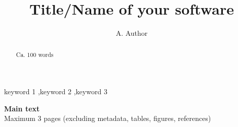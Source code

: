 \documentclass[preprint,12pt, a4paper]{elsarticle}
\begin{document}
\begin{frontmatter}



\title{Title/Name of your software}


\author{A. Author}

\address{Your institute, some address}

\begin{abstract}
Ca. 100 words

\end{abstract}

\begin{keyword}
keyword 1 \sep keyword 2 \sep keyword 3



\end{keyword}

\end{frontmatter}


\noindent
\textbf{Main text}\\
Maximum 3 pages (excluding metadata, tables, figures, references)\\
\end{document}
